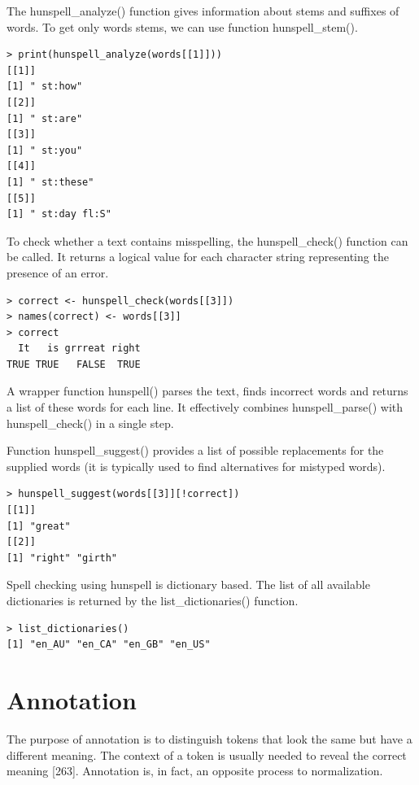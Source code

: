 \documentclass[11pt,openany,executivepaper]{book}
\begin{document}
The hunspell\_analyze() function gives information about stems and suffixes of words. To get only words stems, we can use function hunspell\_stem().

\begin{verbatim}
> print(hunspell_analyze(words[[1]]))
[[1]]
[1] " st:how"
[[2]]
[1] " st:are"
[[3]]
[1] " st:you"
[[4]]
[1] " st:these"
[[5]]
[1] " st:day fl:S"
\end{verbatim}

To check whether a text contains misspelling, the hunspell\_check() function can be called. It returns a logical value for each character string representing the presence of an error.

\begin{verbatim}
> correct <- hunspell_check(words[[3]])
> names(correct) <- words[[3]]
> correct
  It   is grrreat right
TRUE TRUE   FALSE  TRUE
\end{verbatim}

A wrapper function hunspell() parses the text, finds incorrect words and returns a list of these words for each line. It effectively combines hun\-sp\-ell\_parse() with hun\-spell\_check() in a single step.

Function hunspell\_suggest() provides a list of possible replacements for the supplied words (it is typically used to find alternatives for mistyped words).

\begin{verbatim}
> hunspell_suggest(words[[3]][!correct])
[[1]]
[1] "great"
[[2]]
[1] "right" "girth"
\end{verbatim}

Spell checking using hunspell is dictionary based. The list of all available dictionaries is returned by the list\_dictionaries() function.

\begin{verbatim}
> list_dictionaries()
[1] "en_AU" "en_CA" "en_GB" "en_US"
\end{verbatim}

\section{Annotation}
The purpose of annotation is to distinguish tokens that look the same but have a different meaning. The context of a token is usually needed to reveal the correct meaning [263]. Annotation is, in fact, an opposite process to normalization.
\end{document}
